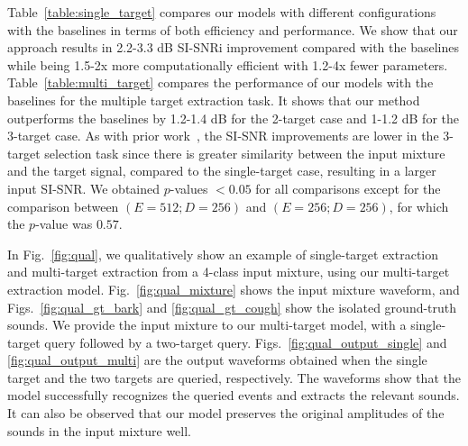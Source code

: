 Table~\ref{table:single_target} compares our models with different configurations with the baselines in terms of both efficiency and performance. We show that our approach  results in 2.2-3.3 dB SI-SNRi improvement compared with the baselines while being 1.5-2x more computationally efficient with 1.2-4x fewer parameters. Table~\ref{table:multi_target}  compares the performance of our models with the baselines for the multiple  target extraction task. It shows  that our method outperforms the baselines by 1.2-1.4 dB for the 2-target case and 1-1.2 dB for the 3-target case. As with prior work~\cite{2020arXiv200605712O}, the SI-SNR improvements are  lower in the 3-target selection task since there is greater similarity between the input mixture and the target signal, compared to the single-target  case, resulting in a larger input SI-SNR. {We obtained $p$-values $< 0.05$ for all comparisons except for the comparison between $(E=512; D=256)$ and $(E=256; D=256)$, for which the $p$-value was $0.57$.}



{
In Fig.~\ref{fig:qual}, we qualitatively show an example of single-target extraction and multi-target extraction from a 4-class input mixture, using our multi-target extraction model. Fig.~\ref{fig:qual_mixture} shows the input mixture waveform, and Figs.~\ref{fig:qual_gt_bark} and \ref{fig:qual_gt_cough} show the isolated ground-truth sounds. We provide the input mixture to our multi-target model, with a single-target query followed by a two-target query. Figs.~\ref{fig:qual_output_single} and \ref{fig:qual_output_multi} are the output waveforms obtained when the single target and the two targets are queried, respectively. The waveforms show that the model successfully recognizes the queried events and extracts the relevant sounds. It can also be observed that our model preserves the original amplitudes of the sounds in the input mixture well.
}



